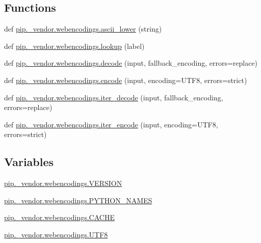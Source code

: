 \subsection*{Functions}
\begin{DoxyCompactItemize}
\item 
def \hyperlink{namespacepip_1_1__vendor_1_1webencodings_afa97e391f2b68992094a339176eff233}{pip.\+\_\+vendor.\+webencodings.\+ascii\+\_\+lower} (string)
\item 
def \hyperlink{namespacepip_1_1__vendor_1_1webencodings_ae558e10f94082a6e5104e4a19de375eb}{pip.\+\_\+vendor.\+webencodings.\+lookup} (label)
\item 
def \hyperlink{namespacepip_1_1__vendor_1_1webencodings_a8de11e3f8c23c682f8e367d23462a5d0}{pip.\+\_\+vendor.\+webencodings.\+decode} (input, fallback\+\_\+encoding, errors=\textquotesingle{}replace\textquotesingle{})
\item 
def \hyperlink{namespacepip_1_1__vendor_1_1webencodings_af737f45c9207721a90c25219dbc89288}{pip.\+\_\+vendor.\+webencodings.\+encode} (input, encoding=U\+T\+F8, errors=\textquotesingle{}strict\textquotesingle{})
\item 
def \hyperlink{namespacepip_1_1__vendor_1_1webencodings_a45fec086851d9f7d2af7ae7715dfa50c}{pip.\+\_\+vendor.\+webencodings.\+iter\+\_\+decode} (input, fallback\+\_\+encoding, errors=\textquotesingle{}replace\textquotesingle{})
\item 
def \hyperlink{namespacepip_1_1__vendor_1_1webencodings_aa5411167f6851dbd04d5813b7da22380}{pip.\+\_\+vendor.\+webencodings.\+iter\+\_\+encode} (input, encoding=U\+T\+F8, errors=\textquotesingle{}strict\textquotesingle{})
\end{DoxyCompactItemize}
\subsection*{Variables}
\begin{DoxyCompactItemize}
\item 
\hyperlink{namespacepip_1_1__vendor_1_1webencodings_a33c958bba3b37600102a9ea1c3140e12}{pip.\+\_\+vendor.\+webencodings.\+V\+E\+R\+S\+I\+ON}
\item 
\hyperlink{namespacepip_1_1__vendor_1_1webencodings_a7193e9e0062f7b2533caa43ad9918bcf}{pip.\+\_\+vendor.\+webencodings.\+P\+Y\+T\+H\+O\+N\+\_\+\+N\+A\+M\+ES}
\item 
\hyperlink{namespacepip_1_1__vendor_1_1webencodings_a99b3ec77071e1286ccce1c9d509cfa39}{pip.\+\_\+vendor.\+webencodings.\+C\+A\+C\+HE}
\item 
\hyperlink{namespacepip_1_1__vendor_1_1webencodings_a2eb014d3f6305ba50ece3cad231b60bf}{pip.\+\_\+vendor.\+webencodings.\+U\+T\+F8}
\end{DoxyCompactItemize}
